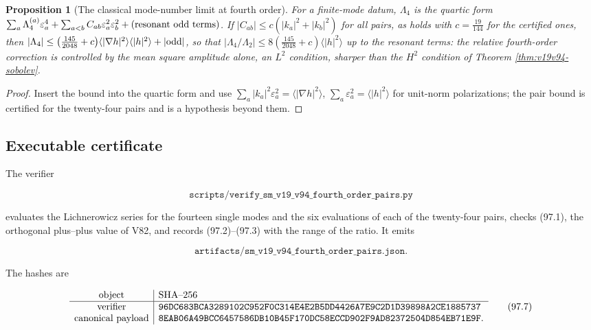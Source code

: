 \documentclass[11pt]{article}
\newtheorem{proposition}[theorem]{Proposition}
\theoremstyle{remark}
\begin{document}
\begin{proposition}[The classical mode-number limit at fourth order]
\label{prop:v19v94-limit}
For a finite-mode datum, \(\Lambda_4\) is the quartic form
\(\sum_a\Lambda_4^{(a)}\varepsilon_a^4+\sum_{a<b}C_{ab}\varepsilon_a^2\varepsilon_b^2+(\hbox{resonant odd terms})\).
If \(|C_{ab}|\leq c(|k_a|^2+|k_b|^2)\) for all pairs, as holds with
\(c=\tfrac{19}{144}\) for the certified ones, then
\(|\Lambda_4|\leq\bigl(\tfrac{145}{2048}+c\bigr)\langle|\nabla h|^2\rangle\langle|h|^2\rangle+|\hbox{odd}|\),
so that \(|\Lambda_4/\Lambda_2|\leq8(\tfrac{145}{2048}+c)\langle|h|^2\rangle\)
up to the resonant terms: the relative fourth-order correction is
controlled by the mean square amplitude alone, an \(L^2\) condition,
sharper than the \(H^2\) condition of Theorem \ref{thm:v19v94-sobolev}.
\end{proposition}

\begin{proof}
Insert the bound into the quartic form and use
\(\sum_a|k_a|^2\varepsilon_a^2=\langle|\nabla h|^2\rangle\),
\(\sum_a\varepsilon_a^2=\langle|h|^2\rangle\) for unit-norm
polarizations; the pair bound is certified for the twenty-four pairs
and is a hypothesis beyond them.
\end{proof}

\subsection{Executable certificate}

The verifier

\[
 \texttt{scripts/verify\_sm\_v19\_v94\_fourth\_order\_pairs.py}      \tag{97.5}
\]

evaluates the Lichnerowicz series for the fourteen single modes and
the six evaluations of each of the twenty-four pairs, checks (97.1),
the orthogonal plus--plus value of V82, and records (97.2)--(97.3)
with the range of the ratio.  It emits

\[
 \texttt{artifacts/sm\_v19\_v94\_fourth\_order\_pairs.json}.         \tag{97.6}
\]

The hashes are

\[
\begin{array}{c|l}
\hbox{object}&\hbox{SHA--256}\\ \hline
\hbox{verifier}&
\texttt{96DC683BCA3289102C952F0C314E4E2B5DD4426A7E9C2D1D39898A2CE1885737}\\
\hbox{canonical payload}&
\texttt{8EAB06A49BCC6457586DB10B45F170DC58ECCD902F9AD82372504D854EB71E9F}.
\end{array}                                                     \tag{97.7}
\]
\end{document}
